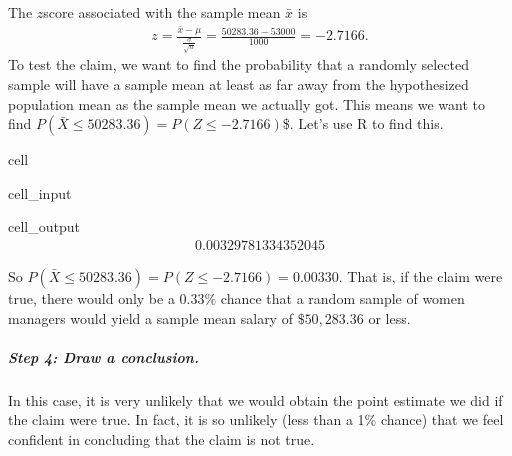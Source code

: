 \documentclass[letterpaper,10pt,english]{jupyterBook}
\begin{document}
\sphinxAtStartPar
The \(z\)\sphinxhyphen{}score associated with the sample mean \(\bar{x}\) is
\begin{equation*}
\begin{split}z = \frac{\bar{x} - \mu}{\frac{\sigma}{\sqrt{n}}} = \frac{50283.36 - 53000}{1000} = -2.7166. \end{split}
\end{equation*}
\sphinxAtStartPar
To test the claim, we want to find the probability that a randomly selected sample will have a sample mean at least as far away from the hypothesized population mean as the sample mean we actually got. This means we want to find \(P(\bar{X} \leq 50283.36) = P(Z \leq -2.7166)\)\$. Let’s use R to find this.

\begin{sphinxuseclass}{cell}\begin{sphinxVerbatimInput}

\begin{sphinxuseclass}{cell_input}
\begin{sphinxVerbatim}[commandchars=\\\{\}]
\end{sphinxVerbatim}

\end{sphinxuseclass}\end{sphinxVerbatimInput}
\begin{sphinxVerbatimOutput}

\begin{sphinxuseclass}{cell_output}\begin{equation*}
\begin{split}0.00329781334352045\end{split}
\end{equation*}
\end{sphinxuseclass}\end{sphinxVerbatimOutput}

\end{sphinxuseclass}
\sphinxAtStartPar
So \(P(\bar{X} \leq 50283.36) = P(Z \leq -2.7166) = 0.00330\). That is, if the claim were true, there would only be a \(0.33\%\) chance that a random sample of women managers would yield a sample mean salary of \(\$50{,}283.36\) or less.


\subparagraph{Step 4: Draw a conclusion.}
\label{\detokenize{Ch6 An Introduction to Hypothesis Testing/6.1 An Introduction to Hypothesis Testing:step-4-draw-a-conclusion}}
\sphinxAtStartPar
In this case, it is very unlikely that we would obtain the point estimate we did if the claim were true. In fact, it is so unlikely (less than a 1\% chance) that we feel confident in concluding that the claim is not true.
\end{document}
